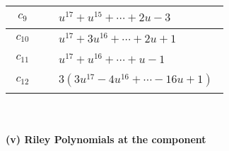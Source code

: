 \documentclass[1p]{elsarticle_modified}
\theoremstyle{definition}
\begin{document}
\begin{tabular}{m{50pt}|m{274pt}}
\hline $$\begin{aligned}c_{9}\end{aligned}$$&$\begin{aligned}
&u^{17}+u^{15}+\cdots+2 u-3
\end{aligned}$\\
\hline $$\begin{aligned}c_{10}\end{aligned}$$&$\begin{aligned}
&u^{17}+3 u^{16}+\cdots+2 u+1
\end{aligned}$\\
\hline $$\begin{aligned}c_{11}\end{aligned}$$&$\begin{aligned}
&u^{17}+u^{16}+\cdots+u-1
\end{aligned}$\\
\hline $$\begin{aligned}c_{12}\end{aligned}$$&$\begin{aligned}
&3(3 u^{17}-4 u^{16}+\cdots-16 u+1)
\end{aligned}$\\
\hline
\end{tabular}\\~\\
\newpage\renewcommand{\arraystretch}{1}
\flushleft \textbf{(v) Riley Polynomials at the component}\newline \\
\end{document}
